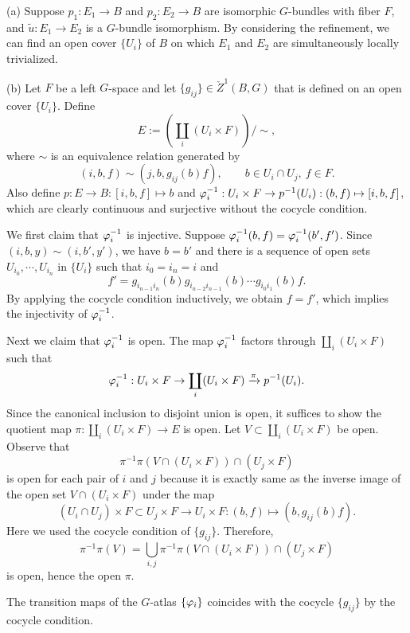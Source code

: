 \documentclass{../../large}
\begin{document}
\begin{pf}
(a)
Suppose $p_1:E_1\to B$ and $p_2:E_2\to B$ are isomorphic $G$-bundles with fiber $F$, and $\tilde u:E_1\to E_2$ is a $G$-bundle isomorphism.
By considering the refinement, we can find an open cover $\{U_i\}$ of $B$ on which $E_1$ and $E_2$ are simultaneously locally trivialized.

(b)
Let $F$ be a left $G$-space and let $\{g_{ij}\}\in\check Z^1(B,G)$ that is defined on an open cover $\{U_i\}$.
Define
\[E:=\left(\coprod_i(U_i\times F)\right)/\sim,\]
where $\sim$ is an equivalence relation generated by
\[(i,b,f)\sim(j,b,g_{ij}(b)f),
\qquad b\in U_i\cap U_j,\ f\in F.\]
Also define $p:E\to B:[i,b,f]\mapsto b$ and $\varphi_i^{-1}:U_i\times F\to p^{-1}(U_i):(b,f)\mapsto[i,b,f]$, which are clearly continuous and surjective without the cocycle condition.

We first claim that $\varphi_i^{-1}$ is injective.
Suppose $\varphi_i^{-1}(b,f)=\varphi_i^{-1}(b',f')$.
Since $(i,b,y)\sim(i,b',y')$, we have $b=b'$ and there is a sequence of open sets $U_{i_0},\cdots,U_{i_n}$ in $\{U_i\}$ such that $i_0=i_n=i$ and
\[f'=g_{i_{n-1}i_n}(b)g_{i_{n-2}i_{n-1}}(b)\cdots g_{i_0i_1}(b)f.\]
By applying the cocycle condition inductively, we obtain $f=f'$, which implies the injectivity of $\varphi_i^{-1}$.

Next we claim that $\varphi_i^{-1}$ is open.
The map $\varphi_i^{-1}$ factors through $\coprod_i(U_i\times F)$ such that
\[\varphi_i^{-1}:U_i\times F\to\coprod_i(U_i\times F)\xrightarrow{\pi}p^{-1}(U_i).\]
Since the canonical inclusion to disjoint union is open, it suffices to show the quotient map $\pi:\coprod_i(U_i\times F)\to E$ is open.
Let $V\subset\coprod_i(U_i\times F)$ be open.
Observe that
\[\pi^{-1}\pi(V\cap(U_i\times F))\cap(U_j\times F)\]
is open for each pair of $i$ and $j$ because it is exactly same as the inverse image of the open set $V\cap(U_i\times F)$ under the map
\[(U_i\cap U_j)\times F\subset U_j\times F\to U_i\times F:(b,f)\mapsto(b,g_{ij}(b)f).\]
Here we used the cocycle condition of $\{g_{ij}\}$.
Therefore,
\[\pi^{-1}\pi(V)=\bigcup_{i,j}\pi^{-1}\pi(V\cap(U_i\times F))\cap(U_j\times F)\]
is open, hence the open $\pi$.

The transition maps of the $G$-atlas $\{\varphi_i\}$ coincides with the cocycle $\{g_{ij}\}$ by the cocycle condition.
\end{pf}
\end{document}
